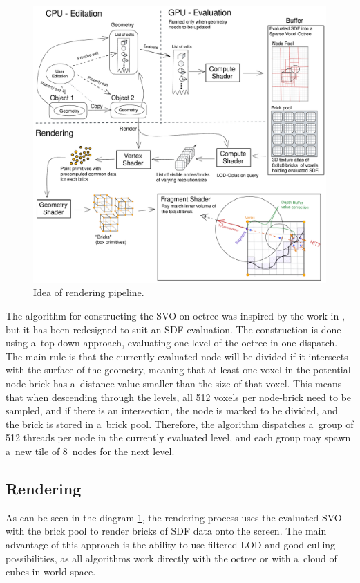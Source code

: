\documentclass[11pt, a4paper]{article}
\begin{document}
\begin{figure}
    \centering
    \includegraphics[width=\textwidth]{desing_idea.pdf}
    \caption{Idea of rendering pipeline.}
    \label{pipeline_idea}
\end{figure}

The algorithm for constructing the SVO on octree was inspired by the work in \cite{crassin2012}, but it has been redesigned to suit an SDF evaluation.
The construction is done using a~top-down approach, evaluating one level of the octree in one dispatch. The main rule is that the currently evaluated node will be divided if it intersects with the surface of the geometry, meaning that at least one voxel in the potential node brick has a~distance value smaller than the size of that voxel.
This means that when descending through the levels, all 512 voxels per node-brick need to be sampled, and if there is an intersection, the node is marked to be divided, and the brick is stored in a~brick pool.
Therefore, the algorithm dispatches a~group of 512 threads per node in the currently evaluated level, and each group may spawn a~new tile of 8~nodes for the next level.

\subsection{Rendering}
As can be seen in the diagram \ref{pipeline_idea}, the rendering process uses the evaluated SVO with the brick pool to render bricks of SDF data onto the screen.
The main advantage of this approach is the ability to use filtered LOD and good culling possibilities, as all algorithms work directly with the octree or with a~cloud of cubes in world space.
\end{document}
